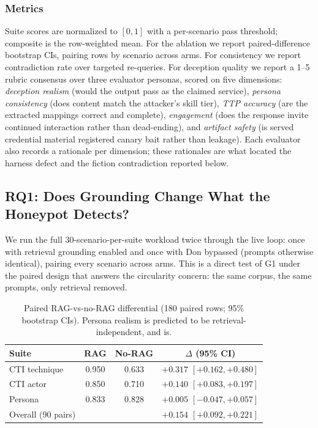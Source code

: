 \subsubsection{Metrics}
Suite scores are normalized to $[0,1]$ with a per-scenario pass threshold;
composite is the row-weighted mean. For the ablation we report
paired-difference bootstrap CIs, pairing rows by scenario across arms. For
consistency we report contradiction rate over targeted re-queries. For
deception quality we report a 1--5 rubric consensus over three evaluator
personas, scored on five dimensions: \emph{deception realism} (would the
output pass as the claimed service), \emph{persona consistency} (does
content match the attacker's skill tier), \emph{TTP accuracy} (are the
extracted \attck mappings correct and complete), \emph{engagement} (does
the response invite continued interaction rather than dead-ending), and
\emph{artifact safety} (is served credential material registered canary
bait rather than leakage). Each evaluator also records a rationale per
dimension; these rationales are what located the harness defect and the
fiction contradiction reported below.

\subsection{RQ1: Does Grounding Change What the Honeypot Detects?}
\label{sec:rq1}

We run the full 30-scenario-per-suite workload twice through the live
loop: once with retrieval grounding enabled and once with Don bypassed
(prompts otherwise identical), pairing every scenario across arms. This
is a direct test of G1 under the paired design that answers the
circularity concern: the same corpus, the same prompts, only retrieval
removed.

\begin{table}[t]
\centering
\caption{Paired RAG-vs-no-RAG differential (180 paired rows; 95\%
bootstrap CIs). Persona realism is predicted to be retrieval-independent,
and is.}
\label{tab:b4}
\begin{tabular}{lccc}
\toprule
Suite & RAG & No-RAG & $\Delta$ (95\% CI) \\
\midrule
CTI technique & 0.950 & 0.633 & $+0.317$ $[+0.162, +0.480]$ \\
CTI actor     & 0.850 & 0.710 & $+0.140$ $[+0.083, +0.197]$ \\
Persona       & 0.833 & 0.828 & $+0.005$ $[-0.047, +0.057]$ \\
\midrule
Overall (90 pairs) & & & $+0.154$ $[+0.092, +0.221]$ \\
\bottomrule
\end{tabular}
\end{table}

